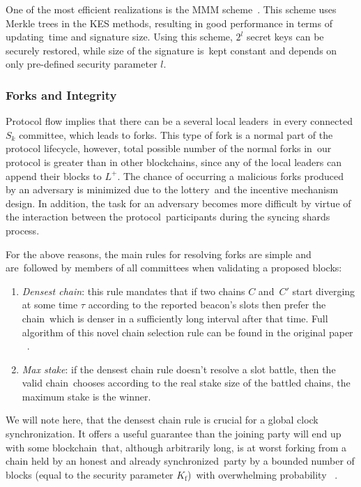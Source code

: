 One of the most efficient realizations is the MMM scheme~\cite{Malkin2002}.
This scheme uses Merkle trees in the KES methods, resulting in good performance in terms of updating\
time and signature size.
Using this scheme, $2^l$ secret keys can be securely restored, while size of the signature is\
kept constant and depends on only pre-defined security parameter $l$.

\subsubsection{Forks and Integrity}\label{subsubsec:resolving-forks}

Protocol flow implies that there can be a several local leaders\
in every connected $S_k$ committee, which leads to forks.
This type of fork is a normal part of the protocol lifecycle, however, total possible number of the normal forks in\
our protocol is greater than in other blockchains, since any of the local leaders can append their blocks to $L^+$.
The chance of occurring a malicious forks produced by an adversary is minimized due to the lottery\
and the incentive mechanism design.
In addition, the task for an adversary becomes more difficult by virtue of the interaction between the protocol\
participants during the syncing shards process.

For the above reasons, the main rules for resolving forks are simple and are\
followed by members of all committees when validating a proposed blocks:
\begin{enumerate}
    \item \textit{Densest chain}: this rule mandates that if two chains $C$ and\
    $C'$ start diverging at some time $\tau$ according to the reported beacon's slots then prefer the chain\
    which is denser in a sufficiently long interval after that time.
    Full algorithm of this novel chain selection rule can be found in the original paper ~\cite{Badertscher2018}.
    \item \textit{Max stake}: if the densest chain rule doesn't resolve a slot battle, then the valid chain\
    chooses according to the real stake size of the battled chains, the maximum stake is the winner.
\end{enumerate}
We will note here, that the densest chain rule is crucial for a global clock synchronization.
It offers a useful guarantee than the joining party will end up with some blockchain\
that, although arbitrarily long, is at worst forking from a chain held by an honest and already synchronized\
party by a bounded number of blocks (equal to the security parameter $K_{\text{f}}$)\
with overwhelming probability ~\cite{cryptoeprint:2019/838}.

